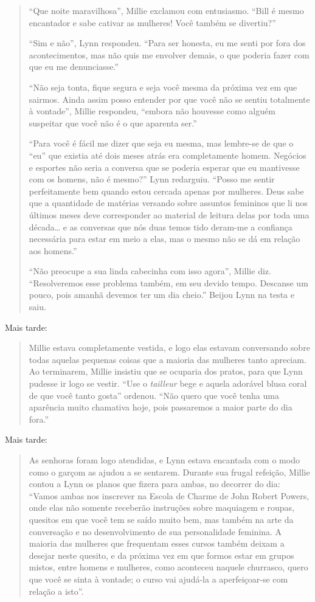 \begin{quote}
``Que noite maravilhosa'', Millie exclamou
com entusiasmo. ``Bill é mesmo encantador e sabe cativar
as mulheres! Você também se divertiu?''

``Sim e não'', Lynn respondeu.
``Para ser honesta, eu me senti por fora dos
acontecimentos, mas não quis me envolver demais, o que poderia fazer
com que eu me denunciasse.''

``Não seja tonta, fique segura e seja você mesma da
próxima vez em que sairmos. Ainda assim posso entender por que você
não se sentiu totalmente à vontade'', Millie respondeu,
``embora não houvesse como alguém suspeitar que você não é
o que aparenta ser.''

``Para você é fácil me dizer que seja eu mesma, mas
lembre-se de que o ``eu'' que existia
até dois meses atrás era completamente homem. Negócios e esportes não
seria a conversa que se poderia esperar que eu mantivesse com os
homens, não é mesmo?'' Lynn redarguiu.
``Posso me sentir perfeitamente bem quando estou cercada
apenas por mulheres. Deus sabe que a quantidade de matérias versando
sobre assuntos femininos que li nos últimos meses deve corresponder ao
material de leitura delas por toda uma década\ldots{} e as conversas que nós
duas temos tido deram-me a confiança necessária para estar em meio a
elas, mas o mesmo não se dá em relação aos homens.''

``Não preocupe a sua linda cabecinha com isso
agora'', Millie diz. ``Resolveremos esse
problema também, em seu devido tempo. Descanse um pouco, pois amanhã
devemos ter um dia cheio.'' Beijou Lynn na testa e saiu.
\end{quote}

Mais tarde:

\begin{quote}
Millie estava completamente vestida, e logo elas estavam conversando
sobre todas aquelas pequenas coisas que a maioria das mulheres tanto
apreciam. Ao terminarem, Millie insistiu que se ocuparia dos pratos,
para que Lynn pudesse ir logo se vestir. ``Use o \textit{tailleur}
bege e aquela adorável blusa coral de que você tanto gosta'' ordenou.
``Não quero que você tenha uma aparência muito chamativa hoje, pois
passaremos a maior parte do dia fora.''
\end{quote}

Mais tarde:

\begin{quote}
As senhoras foram logo atendidas, e Lynn estava encantada com o modo
como o garçom as ajudou a se sentarem. Durante sua frugal refeição,
Millie contou a Lynn os planos que fizera para ambas, no decorrer do dia:
``Vamos ambas nos inscrever na Escola de Charme de
John Robert Powers, onde elas não somente receberão instruções sobre
maquiagem e roupas, quesitos em que você tem se saído muito bem, mas
também na arte da conversação e no desenvolvimento de sua personalidade
feminina. A maioria das mulheres que frequentam esses cursos também
deixam a desejar neste quesito, e da próxima vez em que formos estar em
grupos mistos, entre homens e mulheres, como aconteceu naquele
churrasco, quero que você se sinta à vontade; o curso vai ajudá-la a
aperfeiçoar-se com relação a isto''.
\end{quote}

